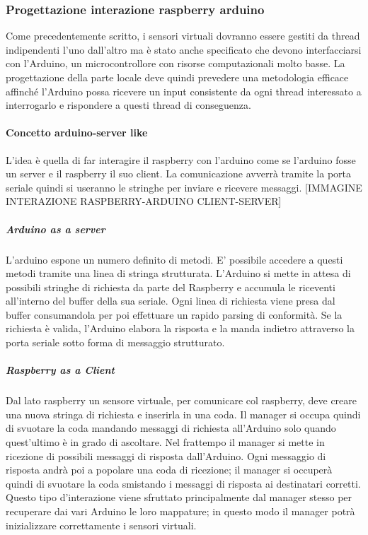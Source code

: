 \documentclass[12pt]{article}
\begin{document}
\subsubsection{Progettazione interazione raspberry arduino}
Come precedentemente scritto, i sensori virtuali dovranno essere gestiti da thread indipendenti l'uno dall'altro ma è stato anche specificato che devono interfacciarsi con l'Arduino, un microcontrollore con risorse computazionali molto basse. La progettazione della parte locale deve quindi prevedere una metodologia efficace affinché l'Arduino possa ricevere un input consistente da ogni thread interessato a interrogarlo e rispondere a questi thread di conseguenza.
\paragraph{Concetto arduino-server like}
L'idea è quella di far interagire il raspberry con l'arduino come se l'arduino fosse un server e il raspberry il suo client. La comunicazione avverrà tramite la porta seriale quindi si useranno le stringhe per inviare e ricevere messaggi.  
[IMMAGINE INTERAZIONE RASPBERRY-ARDUINO CLIENT-SERVER]
\subparagraph{Arduino as a server}
L'arduino espone un numero definito di metodi. E' possibile accedere a questi metodi tramite una linea di stringa strutturata. L'Arduino si mette in attesa di possibili stringhe di richiesta da parte del Raspberry e accumula le riceventi all'interno del buffer della sua seriale.
Ogni linea di richiesta viene presa dal buffer consumandola per poi effettuare un rapido parsing di conformità. Se la richiesta è valida, l'Arduino elabora la risposta e la manda indietro attraverso la porta seriale sotto forma di messaggio strutturato.
\subparagraph{Raspberry as a Client}
Dal lato raspberry un sensore virtuale, per comunicare col raspberry, deve creare una nuova stringa di richiesta e inserirla in una coda. 
Il manager si occupa quindi di svuotare la coda mandando messaggi di richiesta all'Arduino solo quando quest'ultimo è in grado di ascoltare. Nel frattempo il manager si mette in ricezione di possibili messaggi di risposta dall'Arduino. Ogni messaggio di risposta andrà poi a popolare una coda di ricezione; il manager si occuperà quindi di svuotare la coda smistando i messaggi di risposta ai destinatari corretti.
Questo tipo d'interazione viene sfruttato principalmente dal manager stesso per recuperare dai vari Arduino le loro mappature; in questo modo il manager potrà inizializzare correttamente i sensori virtuali.
\newpage
\end{document}
